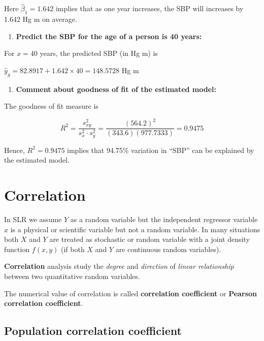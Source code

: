 \documentclass[
  11pt,
  letterpaper,
  DIV=11,
  numbers=noendperiod]{scrreprt}
\providecommand{\tightlist}{%
  \setlength{\itemsep}{0pt}\setlength{\parskip}{0pt}}
\begin{document}
Here \(\hat \beta_1=1.642\) implies that as one year increases, the SBP
will increases by 1.642 Hg m on average.

\begin{enumerate}
\def\labelenumi{\alph{enumi})}
\setcounter{enumi}{21}
\tightlist
\item
  \textbf{Predict the SBP for the age of a person is 40 years:}
\end{enumerate}

For \(x=40\) years, the predicted SBP (in Hg m) is

\(\hat y_g =82.8917+1.642\times 40=148.5728\) Hg m

\begin{enumerate}
\def\labelenumi{\roman{enumi})}
\setcounter{enumi}{5}
\tightlist
\item
  \textbf{Comment about goodness of fit of the estimated model:}
\end{enumerate}

The goodness of fit measure is

\[R^2=\frac{s^2_{xy} }{s^2_x \cdot s^2_y}=\frac{(564.2)^2}{(343.6)(977.7333)}=0.9475\]

Hence, \(R^2=0.9475\) implies that 94.75\% variation in ``SBP'' can be
explained by the estimated model.

\section{Correlation}\label{correlation}

In SLR we assume \(Y\) as a random variable but the independent
regressor variable \(x\) is a physical or scientific variable but not a
random variable. In many situations both \(X\) and \(Y\) are treated as
stochastic or random variable with a joint density function \(f(x,y)\)
(if both \(X\) and \(Y\) are continuous random variables).

\textbf{Correlation} analysis study the \emph{degree} and
\emph{direction} of \emph{linear relationship} between two quantitative
random variables.

The numerical value of correlation is called \textbf{correlation
coefficient} or \textbf{Pearson correlation coefficient}.

\subsection{Population correlation
coefficient}\label{population-correlation-coefficient}
\end{document}
